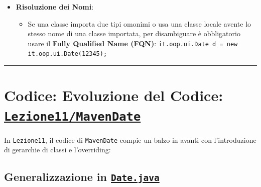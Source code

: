 \documentclass[11pt,a4paper,oneside]{report}
\newcommand{\passthrough}[1]{#1}
\providecommand{\tightlist}{\setlength{\itemsep}{0pt}\setlength{\parskip}{0pt}}
\begin{document}
\begin{itemize}
\tightlist
\item
  \textbf{Risoluzione dei Nomi}:

  \begin{itemize}
  \tightlist
  \item
    Se una classe importa due tipi omonimi o usa una classe locale
    avente lo stesso nome di una classe importata, per disambiguare è
    obbligatorio usare il \textbf{Fully Qualified Name (FQN)}:
    \passthrough{\lstinline!it.oop.ui.Date d = new it.oop.ui.Date(12345);!}
  \end{itemize}
\end{itemize}

\begin{center}\rule{0.5\linewidth}{0.5pt}\end{center}

\section{\texorpdfstring{Codice: Evoluzione del Codice:
\href{file:///home/wally/Documenti/GitHub/Programmazione-II/25-26/Teoria-e-Esercitazioni/Codice-20260902/Lezione11/MavenDate}{\texttt{Lezione11/MavenDate}}}{Codice: Evoluzione del Codice: Lezione11/MavenDate}}\label{chap10_codice-evoluzione-del-codice-lezione11mavendate}

In \passthrough{\lstinline!Lezione11!}, il codice di
\passthrough{\lstinline!MavenDate!} compie un balzo in avanti con
l'introduzione di gerarchie di classi e l'overriding:

\subsection{\texorpdfstring{Generalizzazione in
\href{file:///home/wally/Documenti/GitHub/Programmazione-II/25-26/Teoria-e-Esercitazioni/Codice-20260902/Lezione11/MavenDate/src/main/java/it/oop/core/Date.java}{\texttt{Date.java}}}{Generalizzazione in Date.java}}\label{chap10_generalizzazione-in-date.java}
\end{document}

